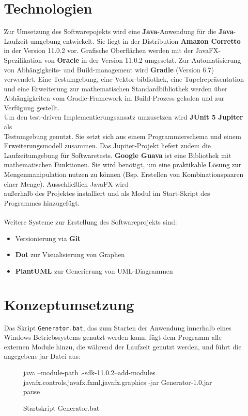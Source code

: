 \section{Technologien}
Zur Umsetzung des Softwarepojekts wird eine \textbf{Java}-Anwendung für die \textbf{Java}-Laufzeit-umgebung entwickelt.
Sie liegt in der Distribution \textbf{Amazon Corretto} in der Version 11.0.2 vor.
Grafische Oberflächen werden mit der JavaFX-Spezifikation von \textbf{Oracle} in der Version 11.0.2 umgesetzt.
Zur Automatisierung von Abhängigkeits- und Build-management wird \textbf{Gradle} (Version 6.7) verwendet.
Eine Testumgebung, eine Vektor-bibliothek, eine Tupelrepräsentation und eine Erweiterung zur mathematischen
Standardbibliothek werden über Abhängigkeiten vom Gradle-Framework im Build-Prozess geladen und zur Verfügung
gestellt.\\
Um den test-driven Implementierungsansatz umzusetzen wird \textbf{JUnit 5 Jupiter} als\\ Testumgebung genutzt.
Sie setzt sich aus einem Programmierschema und einem Erweiterungsmodell zusammen.
Das Jupiter-Projekt liefert zudem die Laufzeitumgebung für Softwaretests.
\textbf{Google Guava} ist eine Bibliothek mit mathematischen Funktionen.
Sie wird benötigt, um eine praktikable Lösung zur Mengenmanipulation nutzen zu können (Bsp. Erstellen
von Kombinationspaaren einer Menge).
Ausschließlich JavaFX wird\\außerhalb des Projektes installiert und als Modul im Start-Skript des Programmes
hinzugefügt.
\\~\\
Weitere Systeme zur Erstellung des Softwareprojekts sind:
\begin{itemize}
    \item Versionierung via \textbf{Git}
    \item \textbf{Dot} zur Visualisierung von Graphen
    \item \textbf{PlantUML} zur Generierung von UML-Diagrammen
\end{itemize}

\newpage

\section{Konzeptumsetzung}

Das Skript \texttt{Generator.bat}, das zum Starten der Anwendung innerhalb eines Windows-Betriebssystems genutzt werden kann,
fügt dem Programm alle externen Module hinzu, die während der Laufzeit genutzt werden, und führt die angegebene jar-Datei aus:
\begin{figure}[H]
    \centering
    \begin{csource}
    java --module-path .\javafx-sdk-11.0.2\lib --add-modules javafx.controls,javafx.fxml,javafx.graphics -jar Generator-1.0.jar
    pause
    \end{csource}
    \caption{Startskript Generator.bat}
\end{figure}

